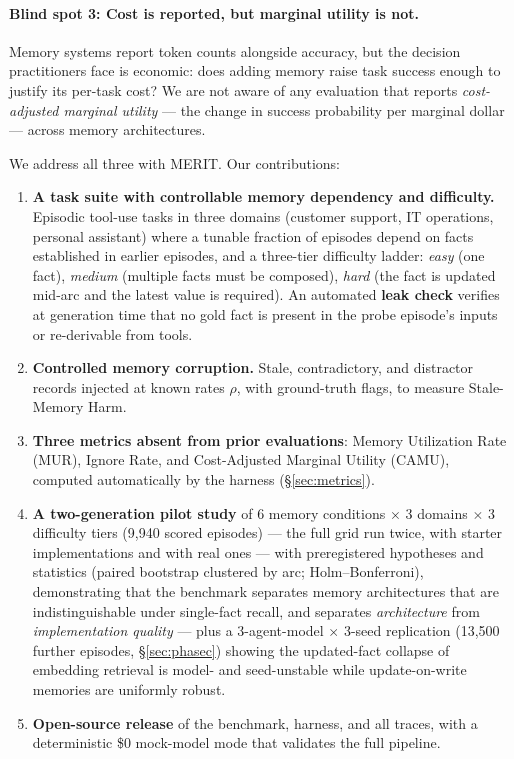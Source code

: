 \documentclass[journal]{IEEEtran}
\newcommand{\merit}{\textsc{MERIT}}
\begin{document}
\paragraph{Blind spot 3: Cost is reported, but marginal utility is not.}
Memory systems report token counts alongside accuracy, but the decision
practitioners face is economic: does adding memory raise task success enough
to justify its per-task cost? We are not aware of any evaluation that reports
\emph{cost-adjusted marginal utility} --- the change in success probability per
marginal dollar --- across memory architectures.

We address all three with \merit{}. Our contributions:

\begin{enumerate}
\item \textbf{A task suite with controllable memory dependency and
difficulty.} Episodic tool-use tasks in three domains (customer support, IT
operations, personal assistant) where a tunable fraction of episodes depend
on facts established in earlier episodes, and a three-tier difficulty ladder:
\emph{easy} (one fact), \emph{medium} (multiple facts must be composed),
\emph{hard} (the fact is updated mid-arc and the latest value is required).
An automated \textbf{leak check} verifies at generation time that no gold
fact is present in the probe episode's inputs or re-derivable from tools.
\item \textbf{Controlled memory corruption.} Stale, contradictory, and
distractor records injected at known rates $\rho$, with ground-truth flags,
to measure Stale-Memory Harm.
\item \textbf{Three metrics absent from prior evaluations}: Memory
Utilization Rate (MUR), Ignore Rate, and Cost-Adjusted Marginal Utility
(CAMU), computed automatically by the harness (\S\ref{sec:metrics}).
\item \textbf{A two-generation pilot study} of 6 memory conditions $\times$
3 domains $\times$ 3 difficulty tiers (9{,}940 scored episodes) --- the full
grid run twice, with starter implementations and with real ones --- with
preregistered hypotheses and statistics (paired bootstrap clustered by arc;
Holm--Bonferroni), demonstrating that the benchmark separates memory
architectures that are indistinguishable under single-fact recall, and
separates \emph{architecture} from \emph{implementation quality} --- plus
a 3-agent-model $\times$ 3-seed replication (13{,}500 further episodes,
\S\ref{sec:phasec}) showing the updated-fact collapse of embedding
retrieval is model- and seed-unstable while update-on-write memories are
uniformly robust.
\item \textbf{Open-source release} of the benchmark, harness, and all
traces, with a deterministic \$0 mock-model mode that validates the full
pipeline.
\end{enumerate}
\end{document}

